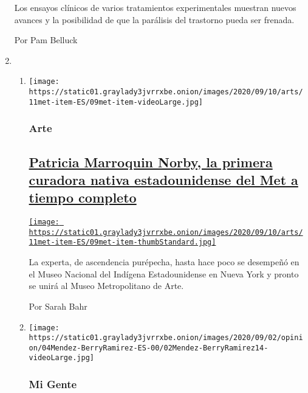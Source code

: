 \begin{enumerate}
  Los ensayos clínicos de varios tratamientos experimentales muestran
  nuevos avances y la posibilidad de que la parálisis del trastorno
  pueda ser frenada.

  Por Pam Belluck
\item
  \begin{enumerate}
  \def\labelenumii{\arabic{enumii}.}
  \item
    \texttt{[image: https://static01.graylady3jvrrxbe.onion/images/2020/09/10/arts/11met-item-ES/09met-item-videoLarge.jpg]}

    \hypertarget{arte}{%
    \subsubsection{Arte}\label{arte}}

    \hypertarget{patricia-marroquin-norby-la-primera-curadora-nativa-estadounidense-del-met-a-tiempo-completo}{%
    \subsection{\texorpdfstring{\href{/es/2020/09/12/espanol/cultura/patricia-marroquin-norby-curadora-met.html}{Patricia
    Marroquin Norby, la primera curadora nativa estadounidense del Met a
    tiempo
    completo}}{Patricia Marroquin Norby, la primera curadora nativa estadounidense del Met a tiempo completo}}\label{patricia-marroquin-norby-la-primera-curadora-nativa-estadounidense-del-met-a-tiempo-completo}}

    \href{/es/2020/09/12/espanol/cultura/patricia-marroquin-norby-curadora-met.html}{\texttt{[image: https://static01.graylady3jvrrxbe.onion/images/2020/09/10/arts/11met-item-ES/09met-item-thumbStandard.jpg]}}

    La experta, de ascendencia purépecha, hasta hace poco se desempeñó
    en el Museo Nacional del Indígena Estadounidense en Nueva York y
    pronto se unirá al Museo Metropolitano de Arte.

    Por Sarah Bahr
  \item
    \texttt{[image: https://static01.graylady3jvrrxbe.onion/images/2020/09/02/opinion/04Mendez-BerryRamirez-ES-00/02Mendez-BerryRamirez14-videoLarge.jpg]}

    \hypertarget{mi-gente}{%
    \subsubsection{Mi Gente}\label{mi-gente}}

    \hypertarget{asuxed-es-como-los-latinos-pueden-ganar-la-guerra-cultural}{%
}
\end{enumerate}
\end{enumerate}
